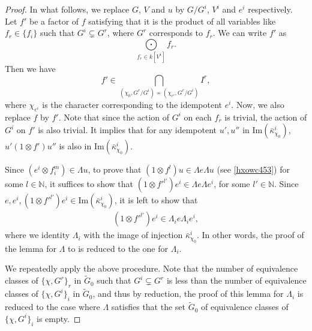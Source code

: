 \documentclass[10pt,a4paper]{amsart}
\begin{document}
\begin{proof}
In what follows, we replace $G$, $V$ 
and $u$ by $G/G^i$, $V^i$ and $e^i$ 
respectively. Let $f'$ be a factor of $f$ 
satisfying 
that it is the product of 
all variables like $f_r \in \{ f_i \}
$ 
such that $G^i \subsetneq G^r $, 
where $G^r$ corresponds to $f_r$. 
We can write $f'$ as
$$
\bigodot\limits_{f_r \in k[V^i]} f_r. 
$$
Then we have 
$$ f' \in \bigcap\limits_{(\chi_0, G^r/G^i) \not\sim (\chi_{e^i}, G^r/G^i)}  I^r,
$$ 
where $\chi_{e^i}$ is the character corresponding to the
idempotent $e^i$. Now, we also replace $f$ by $f'$. 
Note that since the action of $G^i$ on each $f_r$ is trivial, 
the action of $G^i$ on $f'$ is also trivial.
It implies that for any idempotent $u', u''$ in $\mathrm{Im}(\bar{\kappa}^i_{\chi_0})$, 
$u'(1 \otimes f')u''$ is also in $\mathrm{Im}(\bar{\kappa}^i_{\chi_0})$. 


Since $(e^i \otimes f_i^{m}) \in \Lambda u $, to prove that 
$(1 \otimes f^l)u \in \Lambda e \Lambda u$
(see \ref{hxowc453}) for some 
$l \in \mathbb{N}$, 
it suffices to show that
$(1 \otimes f'^{l'})e^i \in \Lambda e \Lambda e^i$, for some
$l' \in \mathbb{N}$. 
Since $e, e^i, (1 \otimes f'^{l'})e^i \in 
\mathrm{Im}(\bar{\kappa}^i_{\chi_0})$, it is left to show that 
\begin{align}\label{ncivfbg}
	(1 \otimes f'^{l'})e^i \in \Lambda_i e \Lambda_i e^{i},
\end{align}
 where 
we identity $\Lambda_i$ with the image 
of injection $\bar{\kappa}^i_{\chi_0}$. 
In other words,
the proof of the lemma for $\Lambda$ to 
is reduced to the one for $\Lambda_i$. 

\vspace{2mm}

We repeatedly apply the above procedure. 
Note that the number of equivalence classes
of $\{\chi, G^r\}_r$ in $\tilde{G}_0$ 
such that $G^i \subsetneq G^r$
is less than the number of equivalence
classes of $\{\chi, G^i\}_i$ in 
$\tilde{G}_0$, and thus
by reduction, the proof of this lemma for $\Lambda_i$ 
is reduced to the case 
where $\Lambda$ satisfies that
the set $\tilde{G}_0$ of equivalence classes of $\{\chi, G^i\}_i$ is empty. 


\end{proof}
\end{document}
